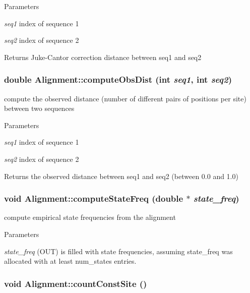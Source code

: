\begin{DoxyParams}{Parameters}
\item[{\em seq1}]index of sequence 1 \item[{\em seq2}]index of sequence 2 \end{DoxyParams}
\begin{DoxyReturn}{Returns}
Juke-\/Cantor correction distance between seq1 and seq2 
\end{DoxyReturn}
\hypertarget{classAlignment_a87ce6b02455c75e5de5125dc3e491e05}{
\subsubsection[{computeObsDist}]{\setlength{\rightskip}{0pt plus 5cm}double Alignment::computeObsDist (int {\em seq1}, \/  int {\em seq2})}}
\label{classAlignment_a87ce6b02455c75e5de5125dc3e491e05}
compute the observed distance (number of different pairs of positions per site) between two sequences 
\begin{DoxyParams}{Parameters}
\item[{\em seq1}]index of sequence 1 \item[{\em seq2}]index of sequence 2 \end{DoxyParams}
\begin{DoxyReturn}{Returns}
the observed distance between seq1 and seq2 (between 0.0 and 1.0) 
\end{DoxyReturn}
\hypertarget{classAlignment_aba9fa7f5358328bf5712049bb00ea2b6}{
\subsubsection[{computeStateFreq}]{\setlength{\rightskip}{0pt plus 5cm}void Alignment::computeStateFreq (double $\ast$ {\em state\_\-freq})}}
\label{classAlignment_aba9fa7f5358328bf5712049bb00ea2b6}
compute empirical state frequencies from the alignment 
\begin{DoxyParams}{Parameters}
\item[{\em state\_\-freq}](OUT) is filled with state frequencies, assuming state\_\-freq was allocated with at least num\_\-states entries. \end{DoxyParams}
\hypertarget{classAlignment_aa9a60448e5e8ac12bbf30557dfaf9018}{
\subsubsection[{countConstSite}]{\setlength{\rightskip}{0pt plus 5cm}void Alignment::countConstSite ()}}
